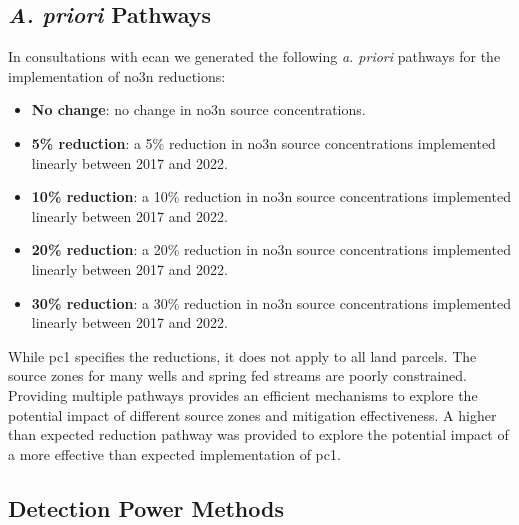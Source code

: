 
\begin{landscape}
\end{landscape}


\subsection[Pathways]{\textit{A. priori} Pathways} \label{subsec:apriori}

In consultations with \gls{ecan} we generated the following \textit{a. priori} pathways for the implementation of \gls{no3n} reductions:
\begin{itemize}
    \item \textbf{No change}: no change in \gls{no3n} source concentrations.
    \item \textbf{5\% reduction}: a 5\% reduction in \gls{no3n} source concentrations implemented linearly between 2017 and 2022.
    \item \textbf{10\% reduction}: a 10\% reduction in \gls{no3n} source concentrations implemented linearly between 2017 and 2022.
    \item \textbf{20\% reduction}: a 20\% reduction in \gls{no3n} source concentrations implemented linearly between 2017 and 2022.
    \item \textbf{30\% reduction}: a 30\% reduction in \gls{no3n} source concentrations implemented linearly between 2017 and 2022.
\end{itemize}

While \gls{pc1} specifies the reductions, it does not apply to all land parcels. The source zones for many wells and spring fed streams are poorly constrained. Providing multiple pathways provides an efficient mechanisms to explore the potential impact of different source zones and mitigation effectiveness. A higher than expected reduction pathway was provided to explore the potential impact of a more effective than expected implementation of \gls{pc1}.

\subsection[Detection Power Methods] {Detection Power Methods} \label{subsec:detection_power_methods}

